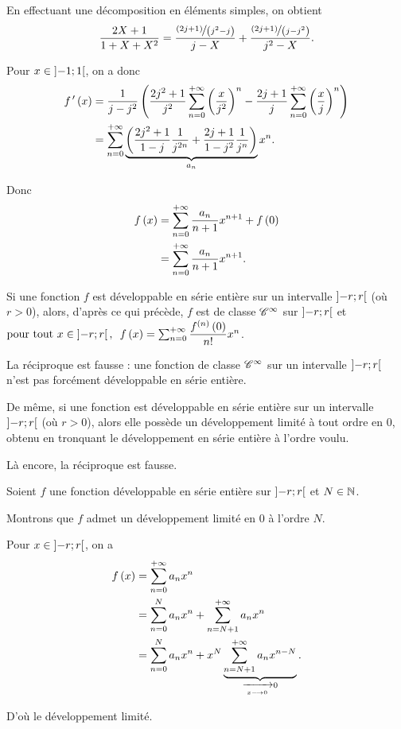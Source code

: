 \begin{corr}
En effectuant une décomposition en éléments simples, on obtient \[\dfrac{2X+1}{1+X+X^2}=\dfrac{\nicefrac{\left(2j+1\right)}{\left(j^2-j\right)}}{j-X}+\dfrac{\nicefrac{\left(2j+1\right)}{\left(j-j^2\right)}}{j^2-X}.\]

Pour \(x\in\left]-1;1\right[\), on a donc \[\begin{aligned}
f^{\,\prime}\left(x\right)&=\dfrac{1}{j-j^2}\left(\dfrac{2j^2+1}{j^2}\sum_{n=0}^{+\infty}\left(\dfrac{x}{j^2}\right)^n-\dfrac{2j+1}{j}\sum_{n=0}^{+\infty}\left(\dfrac{x}{j}\right)^n\right) \\
&=\sum_{n=0}^{+\infty}\underbrace{\left(\dfrac{2j^2+1}{1-j}\dfrac{1}{j^{2n}}+\dfrac{2j+1}{1-j^2}\dfrac{1}{j^n}\right)}_{a_n}x^n.
\end{aligned}\]

Donc \[\begin{aligned}
f\left(x\right)&=\sum_{n=0}^{+\infty}\dfrac{a_n}{n+1}x^{n+1}+f\left(0\right) \\
&=\sum_{n=0}^{+\infty}\dfrac{a_n}{n+1}x^{n+1}.
\end{aligned}\]
\end{corr}

Si une fonction \(f\) est développable en série entière sur un intervalle \(\left]-r;r\right[\) (où \(r>0\)), alors, d'après ce qui précède, \(f\) est de classe \(\mathscr{C}^{\infty}\) sur \(\left]-r;r\right[\) et \(\quantifs{\tpt x\in\intervee{-r}{r}}f\paren{x}=\sum_{n=0}^{\pinf}\dfrac{f\deriv{n}\paren{0}}{n!}x^n\).

La réciproque est fausse : une fonction de classe \(\mathscr{C}^{\infty}\) sur un intervalle \(\left]-r;r\right[\) n'est pas forcément développable en série entière.

De même, si une fonction est développable en série entière sur un intervalle \(\left]-r;r\right[\) (où \(r>0\)), alors elle possède un développement limité à tout ordre en \(0\), obtenu en tronquant le développement en série entière à l'ordre voulu.

Là encore, la réciproque est fausse.

\begin{dem}
Soient \(f\) une fonction développable en série entière sur \(\left]-r;r\right[\) et \(N\in\mathbb{N}\).

Montrons que \(f\) admet un développement limité en \(0\) à l'ordre \(N\).

Pour \(x\in\left]-r;r\right[\), on a \[\begin{aligned}
f\left(x\right)&=\sum_{n=0}^{+\infty}a_nx^n \\
&=\sum_{n=0}^Na_nx^n+\sum_{n=N+1}^{+\infty}a_nx^n \\
&=\sum_{n=0}^Na_nx^n+x^N\underbrace{\sum_{n=N+1}^{+\infty}a_nx^{n-N}}_{\xrightarrow[x\longrightarrow0]{}0}.
\end{aligned}\]

D'où le développement limité.
\end{dem}

